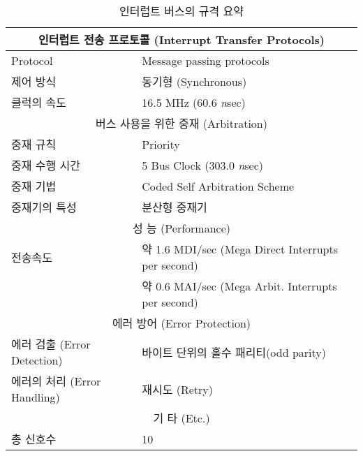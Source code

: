 %
%
\begin{table}[htbp]
\caption{인터럽트 버스의 규격 요약}\label{table:ib-spec}
   \begin{center}
   \begin{tabular}{|l l|} \hline
      \multicolumn{2}{|c|}{인터럽트 전송 프로토콜 (Interrupt Transfer Protocols)} \\
\hline
      Protocol & Message passing protocols \\
      제어 방식 & 동기형 (Synchronous) \\
      클럭의 속도 & 16.5 MHz (60.6 {\it n\/}sec) \\
\hline
      \multicolumn{2}{|c|}{버스 사용을 위한 중재 (Arbitration)} \\
\hline
      중재 규칙 & Priority \\
      중재 수행 시간 & 5 Bus Clock (303.0 {\it n\/}sec) \\
      중재 기법 & Coded Self Arbitration Scheme \\
      중재기의 특성 & 분산형 중재기 \\
\hline
      \multicolumn{2}{|c|}{성 능 (Performance)} \\
\hline
      전송속도 & 약 1.6 MDI/sec (Mega Direct Interrupts per second) \\
      & 약 0.6 MAI/sec (Mega Arbit. Interrupts per second) \\
\hline
      \multicolumn{2}{|c|}{에러 방어 (Error Protection)} \\
\hline
      에러 검출 (Error Detection) & 바이트 단위의 홀수 패리티(odd parity) \\
      에러의 처리 (Error Handling) & 재시도 (Retry) \\
\hline
      \multicolumn{2}{|c|}{기 타 (Etc.)} \\
\hline
      총 신호수 & 10 \\ \hline
   \end{tabular}
   \end{center}
\end{table}
%
%
